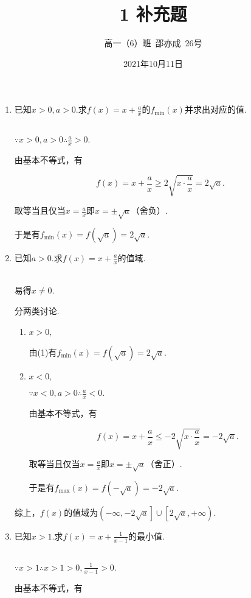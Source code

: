 \documentclass[8pt]{article}
\author{高一（6）班\ 邵亦成\ 26号}
\title{1 补充题}
\date{2021年10月11日}
\begin{document}
	\maketitle

	\begin{enumerate}[(1)]
		\item
			已知$x>0, a>0$.求$f(x)=x+\frac{a}{x}$的$f_{\min}(x)$并求出对应的值.

			~\\
			$\because x>0, a>0 \therefore \frac{a}{x}>0.$

			由基本不等式，有

			$$f(x)=x+\frac{a}{x}\geq2\sqrt{x\cdot\frac{a}{x}}=2\sqrt{a}.$$

			取等当且仅当$x=\frac{a}{x}$即$x=\pm\sqrt{a}$（舍负）.

			于是有$f_{\min}(x)=f(\sqrt{a})=2\sqrt{a}.$

		\item
			已知$a>0$.求$f(x)=x+\frac{a}{x}$的值域.

			~\\
			易得$x\neq0$.

			分两类讨论.

			\begin{enumerate}[$1^\circ$]
				\item
					$x>0,$

					由(1)有$f_{\min}(x)=f(\sqrt{a})=2\sqrt{a}.$

				\item
					$x<0,$

					$\because x<0, a>0 \therefore \frac{a}{x}<0.$

					由基本不等式，有

					$$f(x)=x+\frac{a}{x}\leq-2\sqrt{x\cdot\frac{a}{x}}=-2\sqrt{a}.$$

					取等当且仅当$x=\frac{a}{x}$即$x=\pm\sqrt{a}$（舍正）.

					于是有$f_{\max}(x)=f(-\sqrt{a})=-2\sqrt{a}.$

			\end{enumerate}

			综上，$f(x)$的值域为$\left(-\infty, -2\sqrt{a}\right]\cup\left[2\sqrt{a}, +\infty\right)$.

		\item
			已知$x>1$.求$f(x)=x+\frac{1}{x-1}$的最小值.

			~\\
			$\because x>1 \therefore x>1>0, \frac{1}{x-1}>0.$

			由基本不等式，有


\end{enumerate}
\end{document}
